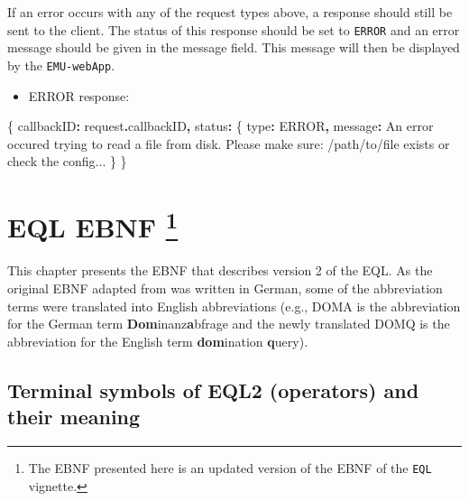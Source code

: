 \documentclass[
]{book}
\newenvironment{Shaded}{\begin{snugshade}}{\end{snugshade}}
\newcommand{\AttributeTok}[1]{\textcolor[rgb]{0.77,0.63,0.00}{#1}}
\newcommand{\NormalTok}[1]{#1}
\newcommand{\OperatorTok}[1]{\textcolor[rgb]{0.81,0.36,0.00}{\textbf{#1}}}
\newcommand{\StringTok}[1]{\textcolor[rgb]{0.31,0.60,0.02}{#1}}
\providecommand{\tightlist}{%
  \setlength{\itemsep}{0pt}\setlength{\parskip}{0pt}}
\begin{document}
If an error occurs with any of the request types above, a response should still be sent to the client. The status of this response should be set to \texttt{ERROR} and an error message should be given in the message field. This message will then be displayed by the \texttt{EMU-webApp}.

\begin{itemize}
\tightlist
\item
  ERROR response:
\end{itemize}

\begin{Shaded}
\begin{Highlighting}[]
\NormalTok{\{}
  \StringTok{\textquotesingle{}callbackID\textquotesingle{}}\OperatorTok{:}\NormalTok{ request}\OperatorTok{.}\AttributeTok{callbackID}\OperatorTok{,}
  \StringTok{\textquotesingle{}status\textquotesingle{}}\OperatorTok{:}\NormalTok{ \{}
    \StringTok{\textquotesingle{}type\textquotesingle{}}\OperatorTok{:} \StringTok{\textquotesingle{}ERROR\textquotesingle{}}\OperatorTok{,}
    \StringTok{\textquotesingle{}message\textquotesingle{}}\OperatorTok{:} \StringTok{\textquotesingle{}An error occured trying to read a file from disk. Please make sure: /path/to/file exists or check the config...}
\NormalTok{  \}}
\NormalTok{\}}
\end{Highlighting}
\end{Shaded}

\hypertarget{app-chap:EQL-EBNF}{%
\chapter[EQL EBNF ]{\texorpdfstring{EQL EBNF \footnote{The EBNF presented here is an updated version of the EBNF of the \texttt{EQL} vignette.}}{EQL EBNF }}\label{app-chap:EQL-EBNF}}

This chapter presents the EBNF \citep{garshol:2003a} that describes version 2 of the EQL. As the original EBNF adapted from \citet{john:2012a} was written in German, some of the abbreviation terms were translated into English abbreviations (e.g., DOMA is the abbreviation for the German term \textbf{Dom}inanz\textbf{a}bfrage and the newly translated DOMQ is the abbreviation for the English term \textbf{dom}ination \textbf{q}uery).

\hypertarget{terminal-symbols-of-eql2-operators-and-their-meaning}{%
\section{Terminal symbols of EQL2 (operators) and their meaning}\label{terminal-symbols-of-eql2-operators-and-their-meaning}}
\end{document}
